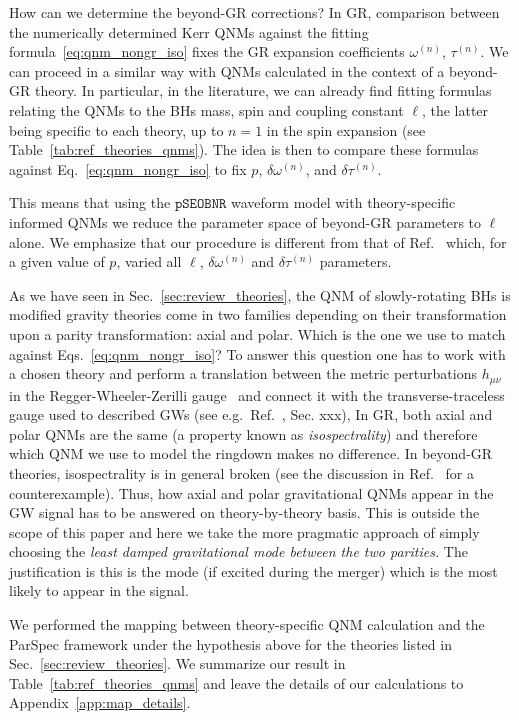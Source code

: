 \documentclass[twocolumn,
               prd,
               aps,
               superscriptaddress,
               tightenlines,
               nofootinbib,
               eqsecnum,
               amsfonts,
               amsmath,
               longbibliography]{revtex4-1}
\newcommand{\pSEOB}{\texttt{pSEOBNR}}
\begin{document}
How can we determine the beyond-GR corrections? In GR, comparison between the numerically determined
Kerr QNMs against the fitting formula~\eqref{eq:qnm_nongr_iso} fixes the GR expansion coefficients
$\omega^{(n)}$, $\tau^{(n)}$.
%
We can proceed in a similar way with QNMs calculated in the context of a beyond-GR theory.
%
In particular, in the literature, we can already find fitting formulas relating
the QNMs to the BHs mass, spin and coupling constant $\ell$, the latter being
specific to each theory, up to $n=1$ in the spin expansion (see Table~\ref{tab:ref_theories_qnms}).
%
The idea is then to compare these formulas against Eq.~\eqref{eq:qnm_nongr_iso}
to fix $p$, $\delta\omega^{(n)}$, and $\delta\tau^{(n)}$.

This means that using the $\pSEOB$ waveform model with theory-specific informed
QNMs we reduce the parameter space of beyond-GR parameters to $\ell$ alone.
%
We emphasize that our procedure is different from that of
Ref.~\cite{Carullo:2021dui} which, for a given value of $p$, varied all $\ell$,
$\delta\omega^{(n)}$ and $\delta\tau^{(n)}$ parameters.

As we have seen in Sec.~\ref{sec:review_theories}, the QNM of slowly-rotating
BHs is modified gravity theories come in two families depending on their
transformation upon a parity transformation: axial and polar. Which is the one
we use to match against Eqs.~\eqref{eq:qnm_nongr_iso}?
%
To answer this question one has to work with a chosen theory and perform a
translation between the metric perturbations $h_{\mu\nu}$ in the
Regger-Wheeler-Zerilli gauge~\cite{Regge:1957td,Zerilli:1970se} and connect it with the transverse-traceless gauge
used to described GWs (see e.g.~Ref.~\cite{Maggiore:2018sht}, Sec. xxx),
%
In GR, both axial and polar QNMs are the same (a property known as \emph{isospectrality}) and therefore which
QNM we use to model the ringdown makes no difference.
%
In beyond-GR theories, isospectrality is in general broken (see the discussion
in Ref.~\cite{Hui:2021cpm} for a counterexample).
%
Thus, how axial and polar gravitational QNMs appear in the GW signal has to be
answered on theory-by-theory basis.
%
This is outside the scope of this paper and here we take the more pragmatic
approach of simply choosing the \emph{least damped gravitational mode between
the two parities.}
%
The justification is this is the mode (if excited during the merger) which is
the most likely to appear in the signal.

We performed the mapping between theory-specific QNM calculation and the ParSpec framework
under the hypothesis above for the theories listed in Sec.~\ref{sec:review_theories}.
%
We summarize our result in Table~\ref{tab:ref_theories_qnms} and
leave the details of our calculations to Appendix~\ref{app:map_details}.
\end{document}
